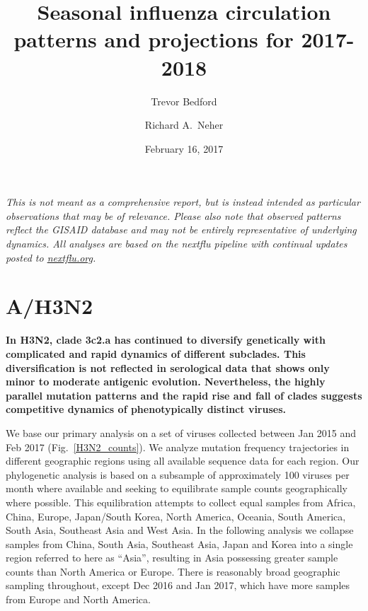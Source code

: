 \documentclass[11pt,oneside,letterpaper]{article}
\title{\vspace{2cm} \LARGE \bf
Seasonal influenza circulation patterns and projections for 2017-2018
}
\author[1]{Trevor Bedford}
\author[2]{Richard A.\ Neher}
\affil[1]{Vaccine and Infectious Disease Division, Fred Hutchinson Cancer Research Center, Seattle, WA, USA}
\affil[2]{Biozentrum, University of Basel, Basel, Switzerland}
\date{February 16, 2017}
\begin{document}
\maketitle

\textit{This is not meant as a comprehensive report, but is instead intended as particular observations that may be of relevance. Please also note that observed patterns reflect the GISAID database and may not be entirely representative of underlying dynamics. All analyses are based on the nextflu pipeline \cite{neher2015nextflu} with continual updates posted to \href{http://nextflu.org}{nextflu.org}.}

\tableofcontents

\pagebreak

\section*{A/H3N2}

\textbf{In H3N2, clade 3c2.a has continued to diversify genetically with complicated and rapid dynamics of different subclades.
This diversification is not reflected in serological data that shows only minor to moderate antigenic evolution.
Nevertheless, the highly parallel mutation patterns and the rapid rise and fall of clades suggests competitive dynamics of phenotypically distinct viruses.}

We base our primary analysis on a set of viruses collected between Jan 2015 and Feb 2017 (Fig.\ \ref{H3N2_counts}).
We analyze mutation frequency trajectories in different geographic regions using all available sequence data for each region.
Our phylogenetic analysis is based on a subsample of approximately 100 viruses per month where available and seeking to equilibrate sample counts geographically where possible.
This equilibration attempts to collect equal samples from Africa, China, Europe, Japan/South Korea, North America, Oceania, South America, South Asia, Southeast Asia and West Asia.
In the following analysis we collapse samples from China, South Asia, Southeast Asia, Japan and Korea into a single region referred to here as ``Asia'', resulting in Asia possessing greater sample counts than North America or Europe.
There is reasonably broad geographic sampling throughout, except Dec 2016 and Jan 2017, which have more samples from Europe and North America.
\end{document}
